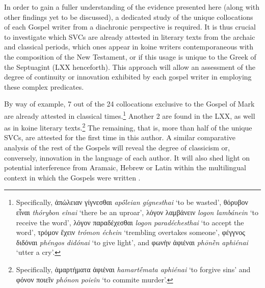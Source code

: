 \documentclass[output=paper,colorlinks,citecolor=brown]{langscibook}
\begin{document}
\z

\z

In order to gain a fuller understanding of the evidence presented here (along with other
findings yet to be discussed), a dedicated study of the unique collocations of each Gospel
writer from a diachronic perspective is required. It is thus crucial to investigate which
SVCs are already attested in literary texts from the archaic and classical periods, which
ones appear in koine writers contemporaneous with the composition of the New Testament, or
if this usage is unique to the Greek of the Septuagint (LXX henceforth). This approach will allow an
assessment of the degree of continuity or innovation exhibited by each gospel writer in
employing these complex predicates.


By way of example, 7 out of the 24 collocations exclusive to the Gospel of Mark are
already attested in classical times.\footnote{Specifically, ἀπώλειαν γίγνεσθαι
  \emph{apṓleian gígnesthai} `to be wasted', θόρυβον εἶναι \emph{thórybon eînai}
  `there be an uproar', λόγον λαμβάνειν \emph{logon lambánein} `to receive the word',
  λόγον παραδέχεσθαι \emph{logon paradéchesthai} `to accept the word', τρόμον ἔχειν
  \emph{trómon échein} `trembling overtakes someone', φέγγνος διδόναι \emph{phéngos
    didónai} `to give light', and φωνὴν ἀφιέναι \emph{phōnḕn aphiénai} `utter a cry'.}
Another 2 are found in the LXX, as well as in koine literary
texts.\footnote{Specifically, ἁμαρτήματα ἀφιέναι \emph{hamartḗmata aphiénai} `to forgive
  sins' and φόνον ποιεῖν \emph{phónon poieîn} `to commite murder'.} The remaining, that
is, more than half of the unique SVCs, are attested for the first time in this author. A
similar comparative analysis of the rest of the Gospels will reveal the degree of
classicism or, conversely, innovation in the language of each author. It will also shed
light on potential interference from Aramaic, Hebrew or Latin within the multilingual
context in which the Gospels were written
\parencites{JanseMark-2007475,JanseMark-2014201,GeorgeCoulterH-2010201,RochetteBruno-2010755}[124--125]{Horrocks2010}.
\end{document}
